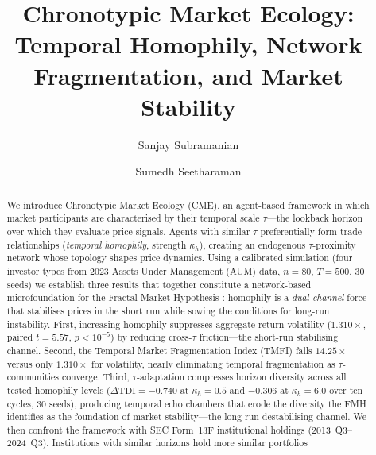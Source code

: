 \documentclass[preprint,12pt,authoryear]{elsarticle}
\begin{document}
\linenumbers

\begin{frontmatter}

\title{Chronotypic Market Ecology: Temporal Homophily,
       Network Fragmentation, and Market Stability}

\author[vchs]{Sanjay Subramanian}

\author[vchs]{Sumedh Seetharaman}



\begin{abstract}
We introduce Chronotypic Market Ecology (CME), an agent-based framework
in which market participants are characterised by their temporal scale
$\tau$---the lookback horizon over which they evaluate price signals.
Agents with similar $\tau$ preferentially form trade relationships
(\emph{temporal homophily}, strength $\kappa_h$), creating an endogenous
$\tau$-proximity network whose topology shapes price dynamics.
Using a calibrated simulation (four investor types from 2023 Assets Under Management (AUM) data,
$n = 80$, $T = 500$, 30 seeds) we establish three results that together
constitute a network-based microfoundation for the Fractal Market
Hypothesis \citep{peters1994}: homophily is a \emph{dual-channel} force
that stabilises prices in the short run while sowing the conditions for
long-run instability.
First, increasing homophily suppresses aggregate return volatility
($1.310\times$, paired $t = 5.57$, $p < 10^{-5}$) by reducing cross-$\tau$
friction---the short-run stabilising channel.
Second, the Temporal Market Fragmentation Index (TMFI) falls $14.25\times$
versus only $1.310\times$ for volatility, nearly eliminating temporal
fragmentation as $\tau$-communities converge.
Third, $\tau$-adaptation compresses horizon diversity across all tested
homophily levels ($\Delta\mathrm{TDI} = -0.740$ at $\kappa_h = 0.5$
and $-0.306$ at $\kappa_h = 6.0$ over ten cycles, 30 seeds),
producing temporal echo chambers that erode the diversity the FMH
identifies as the foundation of market stability---the long-run
destabilising channel.
We then confront the framework with SEC Form~13F institutional holdings
(2013~Q3--2024~Q3).
Institutions with similar horizons hold more similar portfolios

\end{abstract}
\end{frontmatter}
\end{document}

